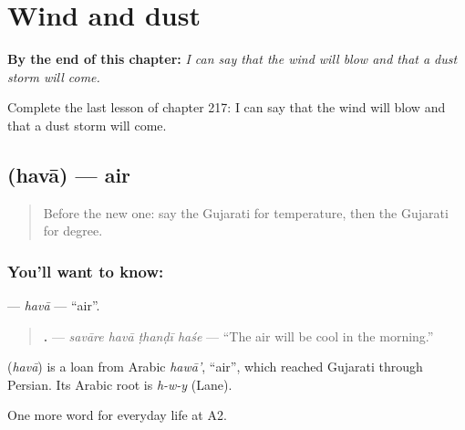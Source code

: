 
\chapter{Wind and dust}
\label{ch:gu-wind-and-dust}

\begin{chapteropening}
\textbf{By the end of this chapter:} \emph{I can say that the wind will blow and that a dust storm will come.}

Complete the last lesson of chapter 217: I can say that the wind will blow and that a dust storm will come.
\end{chapteropening}

\section[\texorpdfstring{\gu{હવા} (havā)}{હવા (havā)}]{ (havā) — air}

\label{lesson:GU-C217-hava}



\begin{quote}
Before the new one: say the Gujarati for temperature, then the Gujarati for degree.
\end{quote}

\subsection*{You'll want to know: }
\textbf{} — \emph{havā} — \textquotedblleft{}air\textquotedblright{}.

\begin{quote}
\textbf{   .} — \emph{savāre havā ṭhanḍī haśe} — \textquotedblleft{}The air will be cool in the morning.\textquotedblright{}
\end{quote}

\begin{cousinweb}
\textbf{} (\emph{havā}) is a loan from Arabic \emph{hawā'}, \textquotedblleft{}air\textquotedblright{}, which reached Gujarati through Persian. Its Arabic root is \emph{h-w-y} (Lane).
\end{cousinweb}

\begin{grammarlens}[title={What you've built}]
One more word for everyday life at A2.
\end{grammarlens}

